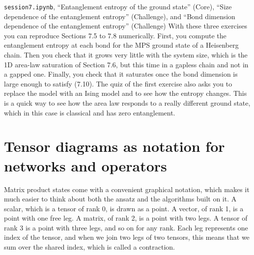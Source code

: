 \begin{notebookbox}{\texttt{session7.ipynb}, ``Entanglement entropy of the ground state'' (Core), ``Size dependence of the entanglement entropy'' (Challenge), and ``Bond dimension dependence of the entanglement entropy'' (Challenge)}
With these three exercises you can reproduce Sections 7.5 to 7.8 numerically. First, you compute the
entanglement entropy at each bond for the MPS ground state of a Heisenberg chain. Then you check that
it grows very little with the system size, which is the 1D area-law saturation of Section 7.6, but
this time in a gapless chain and not in a gapped one. Finally, you check that it saturates once the
bond dimension is large enough to satisfy (7.10). The quiz of the first exercise also asks you to
replace the model with an Ising model and to see how the entropy changes. This is a quick way to see
how the area law responds to a really different ground state, which in this case is classical and has
zero entanglement.
\end{notebookbox}

\section{Tensor diagrams as notation for networks and operators}

Matrix product states come with a convenient graphical notation, which makes it much easier to think
about both the ansatz and the algorithms built on it. A scalar, which is a tensor of rank 0, is drawn
as a point. A vector, of rank 1, is a point with one free leg. A matrix, of rank 2, is a point with two
legs. A tensor of rank 3 is a point with three legs, and so on for any rank. Each leg represents one
index of the tensor, and when we join two legs of two tensors, this means that we sum over the shared
index, which is called a contraction.


